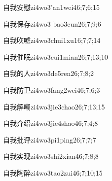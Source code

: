 \begin{verbete}{自我安慰}{zi4wo3'an1wei4}{6;7;6;15}
\end{verbete}

\begin{verbete}{自我保存}{zi4wo3 bao3cun2}{6;7;9;6}
\end{verbete}

\begin{verbete}{自我吹嘘}{zi4wo3chui1xu1}{6;7;7;14}
\end{verbete}

\begin{verbete}{自我催眠}{zi4wo3cui1mian2}{6;7;13;10}
\end{verbete}

\begin{verbete}{自我的人}{zi4wo3de5ren2}{6;7;8;2}
\end{verbete}

\begin{verbete}{自我防卫}{zi4wo3fang2wei4}{6;7;6;3}
\end{verbete}

\begin{verbete}{自我解嘲}{zi4wo3jie3chao2}{6;7;13;15}
\end{verbete}

\begin{verbete}{自我介绍}{zi4wo3jie4shao4}{6;7;4;8}
\end{verbete}

\begin{verbete}{自我批评}{zi4wo3pi1ping2}{6;7;7;7}
\end{verbete}

\begin{verbete}{自我实现}{zi4wo3shi2xian4}{6;7;8;8}
\end{verbete}

\begin{verbete}{自我陶醉}{zi4wo3tao2zui4}{6;7;10;15}
\end{verbete}

